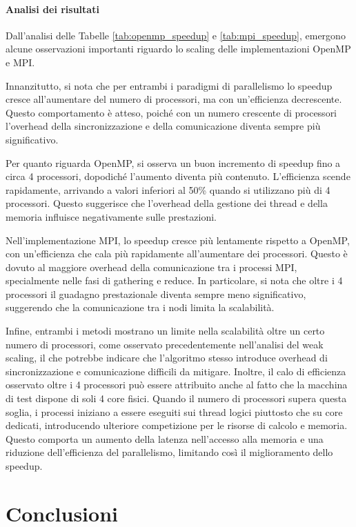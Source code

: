 \documentclass[letterpaper,11pt,leqno]{article}
\begin{document}
\paragraph{Analisi dei risultati}
Dall'analisi delle Tabelle \ref{tab:openmp_speedup} e \ref{tab:mpi_speedup}, emergono alcune osservazioni importanti riguardo lo scaling delle implementazioni OpenMP e MPI.  

Innanzitutto, si nota che per entrambi i paradigmi di parallelismo lo speedup cresce all'aumentare del numero di processori, ma con un'efficienza decrescente. Questo comportamento è atteso, poiché con un numero crescente di processori l'overhead della sincronizzazione e della comunicazione diventa sempre più significativo.  

Per quanto riguarda OpenMP, si osserva un buon incremento di speedup fino a circa 4 processori, dopodiché l'aumento diventa più contenuto. L'efficienza scende rapidamente, arrivando a valori inferiori al 50\% quando si utilizzano più di 4 processori. Questo suggerisce che l'overhead della gestione dei thread e della memoria influisce negativamente sulle prestazioni.  

Nell'implementazione MPI, lo speedup cresce più lentamente rispetto a OpenMP, con un'efficienza che cala più rapidamente all'aumentare dei processori. Questo è dovuto al maggiore overhead della comunicazione tra i processi MPI, specialmente nelle fasi di gathering e reduce. In particolare, si nota che oltre i 4 processori il guadagno prestazionale diventa sempre meno significativo, suggerendo che la comunicazione tra i nodi limita la scalabilità.  

Infine, entrambi i metodi mostrano un limite nella scalabilità oltre un certo numero di processori, come osservato precedentemente nell'analisi del weak scaling, il che potrebbe indicare che l'algoritmo stesso introduce overhead di sincronizzazione e comunicazione difficili da mitigare. Inoltre, il calo di efficienza osservato oltre i 4 processori può essere attribuito anche al fatto che la macchina di test dispone di soli 4 core fisici. Quando il numero di processori supera questa soglia, i processi iniziano a essere eseguiti sui thread logici piuttosto che su core dedicati, introducendo ulteriore competizione per le risorse di calcolo e memoria. Questo comporta un aumento della latenza nell’accesso alla memoria e una riduzione dell'efficienza del parallelismo, limitando così il miglioramento dello speedup.
\section{Conclusioni}
\end{document}
